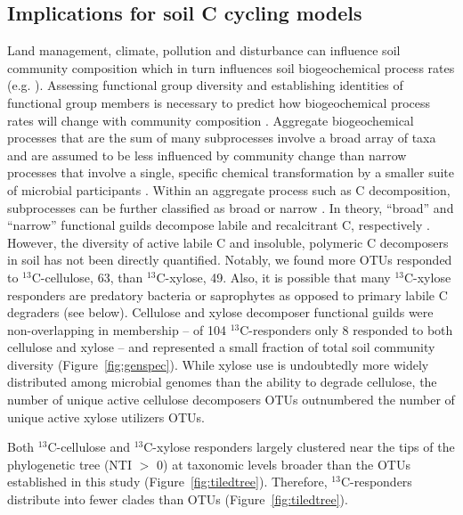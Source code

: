 \subsection{Implications for soil C cycling models}
Land management, climate, pollution and disturbance can influence soil
community composition \citep{McGuire2010} which in turn influences soil
biogeochemical process rates (e.g. \citep{Berlemont2014a}). Assessing
functional group diversity and establishing identities of functional group
members is necessary to predict how biogeochemical process rates will change
with community composition \citep{Schimel_1995,McGuire2010}. Aggregate
biogeochemical processes that are the sum of many subprocesses involve a broad
array of taxa and are assumed to be less influenced by community change than
narrow processes that involve a single, specific chemical transformation by
a smaller suite of microbial participants \citep{Schimel_1995,McGuire2010}.
Within an aggregate process such as C decomposition, subprocesses can be
further classified as broad or narrow \citep{McGuire2010}. In theory,
``broad'' and ``narrow'' functional guilds decompose labile and
recalcitrant C, respectively \citep{McGuire2010}. However, the diversity
of active labile C and insoluble, polymeric C decomposers in soil has not
been directly quantified. Notably, we found more OTUs responded to
$^{13}$C-cellulose, 63, than $^{13}$C-xylose, 49. Also, it is possible that
many $^{13}$C-xylose responders are predatory bacteria or saprophytes as
opposed to primary labile C degraders (see below). Cellulose and xylose
decomposer functional guilds were non-overlapping in membership -- of
104 $^{13}$C-responders only 8 responded to both cellulose and xylose -- and
represented a small fraction of total soil community diversity
(Figure~\ref{fig:genspec}). While xylose use is undoubtedly more widely
distributed among microbial genomes than the ability to degrade cellulose, the
number of unique active cellulose decomposers OTUs outnumbered the number of
unique active xylose utilizers OTUs.

Both $^{13}$C-cellulose and $^{13}$C-xylose responders largely clustered
near the tips of the phylogenetic tree (NTI $>$ 0) at taxonomic levels broader
than the OTUs established in this study (Figure~\ref{fig:tiledtree}).
Therefore, $^{13}$C-responders distribute into fewer clades than OTUs
(Figure~\ref{fig:tiledtree}). 

